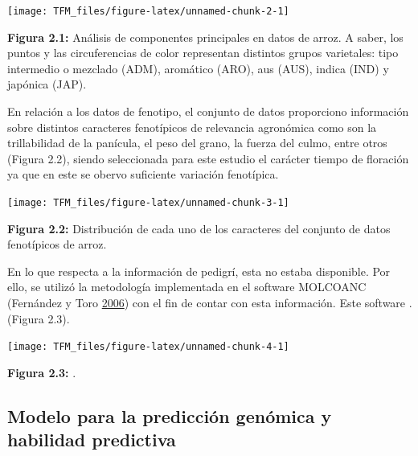 \documentclass[11pt,spanish,a4paper,oneside,]{book} %
\begin{document}
\begin{center}\texttt{[image: TFM\_files/figure-latex/unnamed-chunk-2-1]} \end{center}

\begin{center}
\textbf{Figura 2.1:} Análisis de componentes principales en datos de arroz. A saber, los puntos y las circuferencias de color representan distintos grupos varietales: tipo intermedio o mezclado (ADM), aromático (ARO), aus (AUS), indica (IND) y japónica (JAP).

\end{center}

En relación a los datos de fenotipo, el conjunto de datos proporciono información sobre distintos caracteres fenotípicos de relevancia agronómica como son la trillabilidad de la panícula, el peso del grano, la fuerza del culmo, entre otros (Figura 2.2), siendo seleccionada para este estudio el carácter tiempo de floración ya que en este se obervo suficiente variación fenotípica.

\begin{center}\texttt{[image: TFM\_files/figure-latex/unnamed-chunk-3-1]} \end{center}

\begin{center}
\textbf{Figura 2.2:} Distribución de cada uno de los caracteres del conjunto de datos fenotípicos de arroz.

\end{center}

En lo que respecta a la información de pedigrí, esta no estaba disponible. Por ello, se utilizó la metodología implementada en el software MOLCOANC (Fernández y Toro \protect\hyperlink{ref-cite:24}{2006}) con el fin de contar con esta información. Este software . (Figura 2.3).

\begin{center}\texttt{[image: TFM\_files/figure-latex/unnamed-chunk-4-1]} \end{center}

\begin{center}
\textbf{Figura 2.3:} .

\end{center}

\hypertarget{modelo-para-la-predicciuxf3n-genuxf3mica-y-habilidad-predictiva}{%
\subsection{Modelo para la predicción genómica y habilidad predictiva}\label{modelo-para-la-predicciuxf3n-genuxf3mica-y-habilidad-predictiva}}
\end{document}
